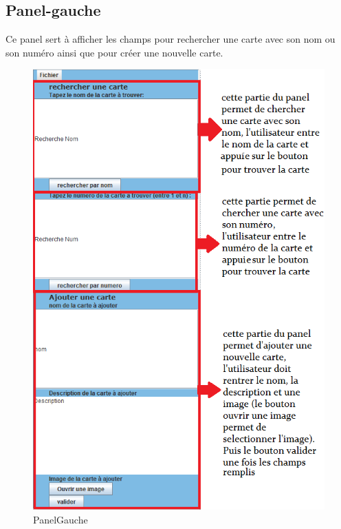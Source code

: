 \documentclass{article}
\begin{document}
\newpage
\subsection{Panel-gauche}
Ce panel sert à afficher les champs pour rechercher une carte avec son nom ou son numéro ainsi que pour créer une nouvelle carte.

\begin{figure}[!h]
\centering
\includegraphics[scale=1]{PanelGauche2.PNG}
\caption{PanelGauche}
\label{fig:PanelGauche}
\end{figure}

\newpage
\end{document}
